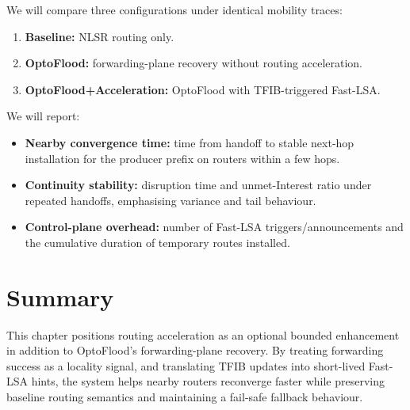 We will compare three configurations under identical mobility traces:

\begin{enumerate}
  \item \textbf{Baseline:} NLSR routing only.
  \item \textbf{OptoFlood:} forwarding-plane recovery without routing acceleration.
  \item \textbf{OptoFlood+Acceleration:} OptoFlood with TFIB-triggered Fast-LSA.
\end{enumerate}

We will report:

\begin{itemize}
  \item \textbf{Nearby convergence time:} time from handoff to stable next-hop installation for the producer prefix on routers within a few hops.
  \item \textbf{Continuity stability:} disruption time and unmet-Interest ratio under repeated handoffs, emphasising variance and tail behaviour.
  \item \textbf{Control-plane overhead:} number of Fast-LSA triggers/announcements and the cumulative duration of temporary routes installed.
\end{itemize}

\section{Summary}
\label{sec:routingacc:summary}

This chapter positions routing acceleration as an optional bounded enhancement in addition to OptoFlood’s forwarding-plane recovery. By treating forwarding success as a locality signal, and translating TFIB updates into short-lived Fast-LSA hints, the system helps nearby routers reconverge faster while preserving baseline routing semantics and maintaining a fail-safe fallback behaviour.